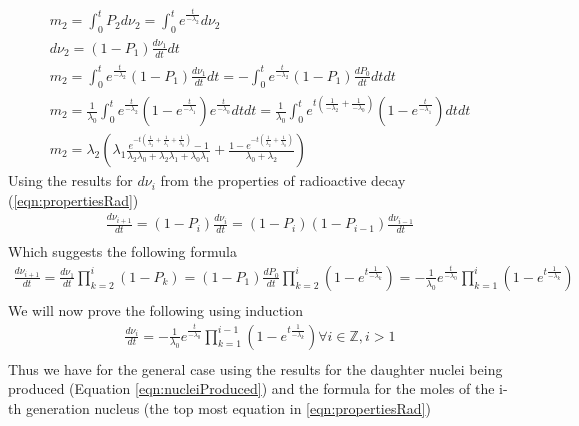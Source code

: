 \documentclass[12pt]{article}
\begin{document}
\begin{equation}\label{eqn:m2derivation}
\begin{split}
m_2 = \int_0^t P_2d\nu_{2} = \int_0^t e^{\frac{t}{-\lambda_2}}d\nu_2\\
d\nu_{2} = (1-P_{1})\frac{d\nu_{1}}{dt}dt\\
m_2 = \int_0^t e^{\frac{t}{-\lambda_2}}(1-P_{1})\frac{d\nu_{1}}{dt}dt = -\int_0^t e^{\frac{t}{-\lambda_2}}(1-P_{1})\frac{dP_0}{dt}dtdt\\
m_2 = \frac{1}{\lambda_0}\int_0^t e^{\frac{t}{-\lambda_2}}(1-e^{\frac{t}{-\lambda_1}})e^{\frac{t}{-\lambda_0}}dtdt = 
\frac{1}{\lambda_0}\int_0^t e^{t(\frac{1}{-\lambda_2}+\frac{1}{-\lambda_0})}(1-e^{\frac{t}{-\lambda_1}})dtdt\\
m_2 = \lambda_2(\lambda_1\frac{e^{-t(\frac{1}{\lambda_2}+\frac{1}{\lambda_1}+\frac{1}{\lambda_0})}-1}{\lambda_2\lambda_0+\lambda_2\lambda_1+\lambda_0\lambda_1}+\frac{1-e^{-t(\frac{1}{\lambda_2}+\frac{1}{\lambda_0})}}{\lambda_0+\lambda_2})
\end{split}
\end{equation}
Using the results for $d\nu_i$ from the properties of radioactive decay (\ref{eqn:propertiesRad})
\begin{equation}
\begin{split}
\frac{d\nu_{i+1}}{dt} = (1-P_{i})\frac{d\nu_{i}}{dt} =  (1-P_{i})(1-P_{i-1})\frac{d\nu_{i-1}}{dt}\\
\end{split}
\end{equation}
Which suggests the following formula 
\begin{equation}
\begin{split}
\frac{d\nu_{i+1}}{dt} = \frac{d\nu_{1}}{dt}\prod_{k=2}^{i} (1-P_{k}) = (1-P_{1})\frac{dP_0}{dt}\prod_{k=2}^{i} (1-e^{t\frac{1}{-\lambda_k}}) = -\frac{1}{\lambda_0}e^{\frac{t}{-\lambda_0}}\prod_{k=1}^{i} (1-e^{t\frac{1}{-\lambda_k}}) \\
\end{split}
\end{equation}
We will now prove the following using induction 
\begin{equation}\label{eqn:nucleiProduced}
\begin{split}
\frac{d\nu_{i}}{dt} = -\frac{1}{\lambda_0}e^{\frac{t}{-\lambda_0}}\prod_{k=1}^{i-1} (1-e^{t\frac{1}{-\lambda_k}})\forall i\in\mathbb{Z}, i>1\\
\end{split}
\end{equation}
Thus we have for the general case using the results for the daughter nuclei being produced (Equation \ref{eqn:nucleiProduced}) and the formula for the moles of the i-th generation nucleus (the top most equation in \ref{eqn:propertiesRad})
\end{document}
